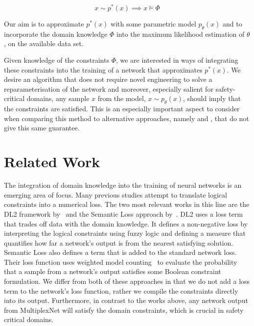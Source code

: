 \documentclass[letterpaper]{article} %
\begin{document}
\begin{equation}
    \label{eq:domain_constraints}
    x \sim p^*(x) \implies x \models \Phi
\end{equation}


Our aim is to approximate $p^*(x)$ with some parametric model $p_\theta(x)$ and to incorporate the domain knowledge $\Phi$ into the maximum likelihood estimation of $\theta$, on the available data set.

Given knowledge of the constraints $\Phi$, we are interested in ways of integrating these constraints into the training of a network that approximates $p^*(x)$.
We desire an algorithm that does not require novel engineering to solve a reparameterisation of the network and moreover, especially salient for safety-critical domains, any sample $x$ from the model, $x \sim p_\theta(x)$, should imply that the constraints are satisfied.
This is an especially important aspect to consider when comparing this method to alternative approaches, namely \citet{fischer2018dl2} and \citet{xu2017semantic}, that do not give this same guarantee.


\section{Related Work}

The integration of domain knowledge into the training of neural networks is an emerging area of focus.
Many previous studies attempt to translate logical constraints into a numerical loss.
The two most relevant works in this line are the DL2 framework by~\citet{fischer2018dl2} and the Semantic Loss approach by~\citet{xu2017semantic}.
DL2 uses a loss term that trades off data with the domain knowledge.
It defines a non-negative loss by interpreting the logical constraints using fuzzy logic and defining a measure that quantifies how far a network's output is from the nearest satisfying solution.
Semantic Loss also defines a term that is added to the standard network loss.
Their loss function uses weighted model counting~\citep{chavira2008probabilistic} to evaluate the probability that a sample from a network's output satisfies some Boolean constraint formulation.
We differ from both of these approaches in that we do not add a loss term to the network's loss function, rather we compile the constraints directly into its output.
Furthermore, in contrast to the works above, any network output from MultiplexNet will satisfy the domain constraints, which is crucial in safety critical domains.
\end{document}
